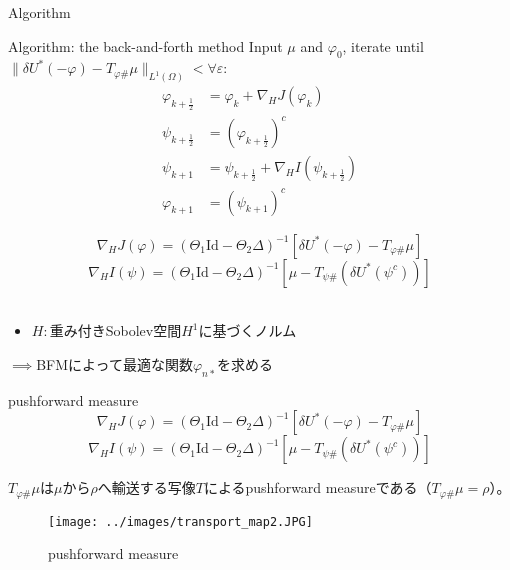 \documentclass[dvipdfmx, 12pt]{beamer}
\begin{document}




\begin{frame}{Algorithm}
    \begin{block}{Algorithm: the back-and-forth method}
        Input $\mu$ and $\varphi_0$, iterate until $\|\delta U^*(- \varphi) - T_{\varphi \#} \mu \|_{L^1(\Omega)} <  \forall \varepsilon$:
        \begin{align*}
            \varphi_{k + \frac{1}{2}} &= \varphi_k + \nabla_H J(\varphi_k)\\
            \psi_{k + \frac{1}{2}} &= (\varphi_{k + \frac{1}{2}})^c\\
            \psi_{k + 1} &= \psi_{k + \frac{1}{2}} + \nabla_H I(\psi_{k + \frac{1}{2}})\\
            \varphi_{k + 1} &= (\psi_{k + 1})^c
        \end{align*}
    \end{block}
    \[
        \nabla_H J(\varphi) = (\Theta_1 \text{Id} - \Theta_2 \Delta)^{-1} \left[\delta U^*(- \varphi)-  T_{\varphi \#} \mu \right]
    \]
    \[
        \nabla_H I(\psi) = (\Theta_1 \text{Id} - \Theta_2 \Delta)^{-1} \left[\mu - T_{\psi \#} (\delta U^*(\psi^c))\right]
    \]\\

    \begin{itemize}
        \item $H:$重み付きSobolev空間$H^1$に基づくノルム
    \end{itemize}
    $\implies $BFMによって最適な関数$\varphi_{n*}$を求める

\end{frame}

\begin{frame}{pushforward measure}
    \[
        \nabla_H J(\varphi) = (\Theta_1 \text{Id} - \Theta_2 \Delta)^{-1} \left[\delta U^*(- \varphi)-  T_{\varphi \#} \mu \right]
    \]
    \[
        \nabla_H I(\psi) = (\Theta_1 \text{Id} - \Theta_2 \Delta)^{-1} \left[\mu - T_{\psi \#} (\delta U^*(\psi^c))\right]
    \]
    

    \(T_{\varphi\#} \mu\)は\(\mu\)から\(\rho\)へ輸送する写像\(T\)によるpushforward measureである（\(T_{\varphi\#} \mu = \rho\)）。
    \begin{figure}[htbp]
        \begin{center}
            \texttt{[image: ../images/transport\_map2.JPG]}
            \caption{pushforward measure}
        \end{center}
    \end{figure}
\end{frame}
\end{document}
